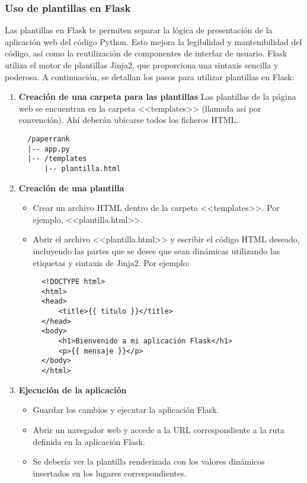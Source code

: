 \subsubsection{Uso de plantillas en Flask}

Las plantillas en Flask te permiten separar la lógica de presentación de la aplicación web del código Python. Esto mejora la legibilidad y mantenibilidad del código, así como la reutilización de componentes de interfaz de usuario. Flask utiliza el motor de plantillas Jinja2, que proporciona una sintaxis sencilla y poderosa. A continuación, se detallan los pasos para utilizar plantillas en Flask:

\begin{enumerate}
  \item \textbf{Creación de una carpeta para las plantillas}
    Las plantillas de la página web se encuentran en la carpeta <<templates>> (llamada así por convención). Ahí deberán ubicarse todos los ficheros HTML.

  \begin{verbatim}
  /paperrank
  |-- app.py
  |-- /templates
      |-- plantilla.html
  \end{verbatim}

  \item \textbf{Creación de una plantilla}

  \begin{itemize}
    \item Crear un archivo HTML dentro de la carpeta <<templates>>. Por ejemplo, <<plantilla.html>>.
    \item Abrir el archivo <<plantilla.html>> y escribir el código HTML deseado, incluyendo las partes que se desee que sean dinámicas utilizando las etiquetas y sintaxis de Jinja2. Por ejemplo:
  

  \begin{verbatim}
  <!DOCTYPE html>
  <html>
  <head>
      <title>{{ titulo }}</title>
  </head>
  <body>
      <h1>Bienvenido a mi aplicación Flask</h1>
      <p>{{ mensaje }}</p>
  </body>
  </html>
  \end{verbatim}
\end{itemize} 

  \item \textbf{Ejecución de la aplicación}

  \begin{itemize}
    \item Guardar los cambios y ejecutar la aplicación Flask.
    \item Abrir un navegador web y accede a la URL correspondiente a la ruta definida en la aplicación Flask.
    \item Se debería ver la plantilla renderizada con los valores dinámicos insertados en los lugares correspondientes.
  \end{itemize}
\end{enumerate}



